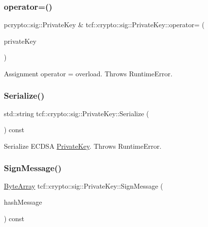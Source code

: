 \subsubsection{\texorpdfstring{operator=()}{operator=()}}
{\footnotesize\ttfamily pcrypto\+::sig\+::\+Private\+Key \& tcf\+::crypto\+::sig\+::\+Private\+Key\+::operator= (\begin{DoxyParamCaption}\item[{const \hyperlink{classtcf_1_1crypto_1_1sig_1_1PrivateKey}{Private\+Key} \&}]{private\+Key }\end{DoxyParamCaption})}

Assignment operator = overload. Throws Runtime\+Error. \mbox{\label{classtcf_1_1crypto_1_1sig_1_1PrivateKey_adf7cdfc64842e06e6e6de2cdee5c6a5a}} 
\subsubsection{\texorpdfstring{Serialize()}{Serialize()}}
{\footnotesize\ttfamily std\+::string tcf\+::crypto\+::sig\+::\+Private\+Key\+::\+Serialize (\begin{DoxyParamCaption}{ }\end{DoxyParamCaption}) const}

Serialize E\+C\+D\+SA \hyperlink{classtcf_1_1crypto_1_1sig_1_1PrivateKey}{Private\+Key}. Throws Runtime\+Error. \mbox{\label{classtcf_1_1crypto_1_1sig_1_1PrivateKey_a294c33f936b4e737e273fed5efb4f20c}} 
\subsubsection{\texorpdfstring{Sign\+Message()}{SignMessage()}}
{\footnotesize\ttfamily \hyperlink{types_8h_a35da937e2331acce98d47f44892f4a76}{Byte\+Array} tcf\+::crypto\+::sig\+::\+Private\+Key\+::\+Sign\+Message (\begin{DoxyParamCaption}\item[{const \hyperlink{types_8h_a35da937e2331acce98d47f44892f4a76}{Byte\+Array} \&}]{hash\+Message }\end{DoxyParamCaption}) const}

